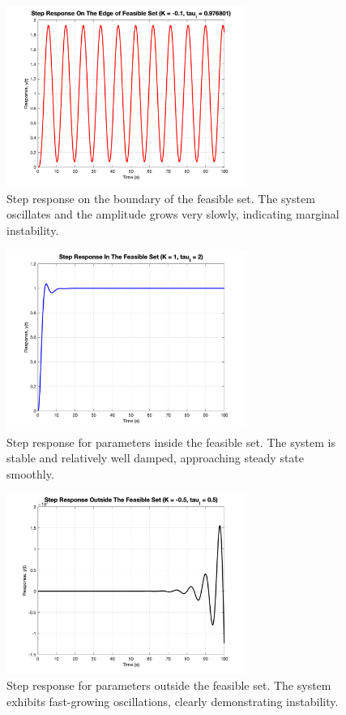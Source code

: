 \documentclass[12pt]{article}
\begin{document}
\begin{enumerate}
\begin{enumerate}
      \begin{figure}[H]
        \centering
        \includegraphics[width=0.7\textwidth]{Figures/figure1-3b.png}
        \caption{Step response on the boundary of the feasible set. The system oscillates and the amplitude grows very slowly, indicating marginal instability.}
      \end{figure}
      
      \begin{figure}[H]
        \centering
        \includegraphics[width=0.7\textwidth]{Figures/figure1-3c.png}
        \caption{Step response for parameters inside the feasible set. The system is stable and relatively well damped, approaching steady state smoothly.}
      \end{figure}
      
      \begin{figure}[H]
        \centering
        \includegraphics[width=0.7\textwidth]{Figures/figure1-3d.png}
        \caption{Step response for parameters outside the feasible set. The system exhibits fast-growing oscillations, clearly demonstrating instability.}
      \end{figure}
      

\end{enumerate}
\end{enumerate}
\end{document}
